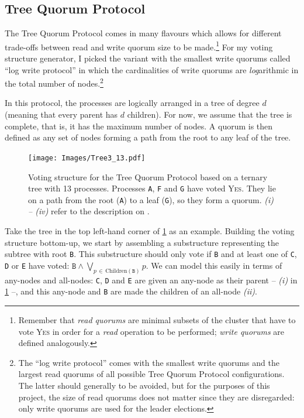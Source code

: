 \documentclass[12pt,chapterprefix=true,toc=bibliography,numbers=noendperiod,
               footnotes=multiple,twoside]{scrreprt}
\newcommand{\yes}{{\fontfamily{jkposn}\selectfont\textsc{Yes}}}
\begin{document}
\subsection{Tree Quorum Protocol}
\label{ssc:tree}

The Tree Quorum Protocol \autocite{tree} comes in many flavours which allows for different trade-offs between read and write quorum size to be made.\footnote{Remember that \emph{read quorums} are minimal subsets of the cluster that have to vote \yes{} in order for a \emph{read} operation to be performed; \emph{write quorums} are defined analogously.} For my voting structure generator, I picked the variant with the smallest write quorums called \enquote{log write protocol} in which the cardinalities of write quorums are \emph{log}arithmic in the total number of nodes.\footnote{The \enquote{log write protocol} comes with the smallest write quorums and the largest read quorums of all possible Tree Quorum Protocol configurations. The latter should generally to be avoided, but for the purposes of this project, the size of read quorums does not matter since they are disregarded: only write quorums are used for the leader elections.}

In this protocol, the processes are logically arranged in a tree of degree \(d\) (meaning that every parent has \(d\) children). For now, we assume that the tree is complete, that is, it has the maximum number of nodes. A quorum is then defined as any set of nodes forming a path from the root to any leaf of the tree.

\begin{figure}[h]
    \centering
    \texttt{[image: Images/Tree3\_13.pdf]}
    \caption{Voting structure for the Tree Quorum Protocol based on a ternary tree with 13 processes. Processes \texttt{A}, \texttt{F} and \texttt{G} have voted \yes. They lie on a path from the root (\texttt{A}) to a leaf (\texttt{G}), so they form a quorum. \emph{(i) -- (iv)} refer to the description on .}
    \label{fig:grid3_13}
\end{figure}

Take the tree in the top left-hand corner of \cref{fig:grid3_13} as an example. \label{p:tree-explanation}Building the voting structure bottom-up, we start by assembling a substructure representing the subtree with root \texttt{B}. This substructure should only vote if \texttt{B} and at least one of \texttt{C}, \texttt{D} or \texttt{E} have voted: \( \texttt{B} \wedge \bigvee_{p\,\in\,\text{Children}(\texttt{B})} p \). We can model this easily in terms of any-nodes and all-nodes: \texttt{C}, \texttt{D} and \texttt{E} are given an any-node as their parent -- \emph{(i)} in \cref{fig:grid3_13} --, and this any-node and \texttt{B} are made the children of an all-node \emph{(ii)}.
\end{document}
